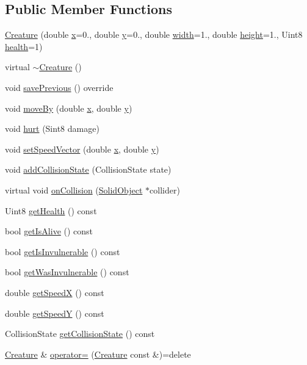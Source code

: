 \subsection*{Public Member Functions}
\begin{DoxyCompactItemize}
\item 
\hyperlink{class_creature_a159a60797dd021854f552fa5359c160c}{Creature} (double \hyperlink{class_object_a02010c1708632be33a760486b1f648f8}{x}=0., double \hyperlink{class_object_a542c4d6094ace575fb4a28f46b9cc6a1}{y}=0., double \hyperlink{class_object_a3afad0ab476968e517b6f48c2a32719f}{width}=1., double \hyperlink{class_object_a811bf2cbf614c4f0a3935a83fb639ffd}{height}=1., Uint8 \hyperlink{class_creature_a312bc862a499a3955e74b5215d3bd1c5}{health}=1)
\item 
virtual \hyperlink{class_creature_aa991b23f4813fbdb6f875204ed49814d}{$\sim$\+Creature} ()
\item 
void \hyperlink{class_creature_ab0f46259c6eafea41ed737a67954b1d2}{save\+Previous} () override
\item 
void \hyperlink{class_creature_a2fe01ed4304c4ca0957f9ea4e7e958e0}{move\+By} (double \hyperlink{class_object_a02010c1708632be33a760486b1f648f8}{x}, double \hyperlink{class_object_a542c4d6094ace575fb4a28f46b9cc6a1}{y})
\item 
void \hyperlink{class_creature_a34b51efbd2bb90ef56c71bd497b5d49a}{hurt} (Sint8 damage)
\item 
void \hyperlink{class_creature_ad2d2745b1075df6ecc540e9e52bfb00a}{set\+Speed\+Vector} (double \hyperlink{class_object_a02010c1708632be33a760486b1f648f8}{x}, double \hyperlink{class_object_a542c4d6094ace575fb4a28f46b9cc6a1}{y})
\item 
void \hyperlink{class_creature_a6b4b0da1e5959329ce54f2ed0a301a31}{add\+Collision\+State} (Collision\+State state)
\item 
virtual void \hyperlink{class_creature_a246ee43c5eef1bafa18c88c3a748356e}{on\+Collision} (\hyperlink{class_solid_object}{Solid\+Object} $\ast$collider)
\item 
Uint8 \hyperlink{class_creature_a23349b0b68b4ffb0e90b71e4bcc38909}{get\+Health} () const 
\item 
bool \hyperlink{class_creature_a7d4dc38f5b1dad4258af115ecefdb064}{get\+Is\+Alive} () const 
\item 
bool \hyperlink{class_creature_a9fe784b4d6e9366063d623a30614b5c5}{get\+Is\+Invulnerable} () const 
\item 
bool \hyperlink{class_creature_a3462b44cfb1090751e5004b1ee6c632e}{get\+Was\+Invulnerable} () const 
\item 
double \hyperlink{class_creature_ad71518008ffb52d310315bdc31dd1aa5}{get\+SpeedX} () const 
\item 
double \hyperlink{class_creature_aeefbce5184dca2daab05559eb03d56eb}{get\+SpeedY} () const 
\item 
Collision\+State \hyperlink{class_creature_a2d7a9d6d9d7cf6be27de6ff8ff4c33d6}{get\+Collision\+State} () const 
\item 
\hyperlink{class_creature}{Creature} \& \hyperlink{class_creature_a5aeab5f0ed4a29bf22bce9b3383a54d8}{operator=} (\hyperlink{class_creature}{Creature} const \&)=delete
\end{DoxyCompactItemize}
